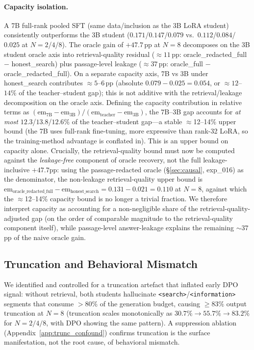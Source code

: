 \paragraph{Capacity isolation.}
\label{sec:capacity}
A 7B full-rank pooled SFT (same data/inclusion as the 3B LoRA student) consistently outperforms the 3B student ($0.171$/$0.147$/$0.079$ vs.\ $0.112$/$0.084$/$0.025$ at $N\!=\!2$/$4$/$8$). The oracle gain of $+47.7$\,pp at $N{=}8$ decomposes on the 3B student oracle axis into retrieval-quality residual ($\approx 11$\,pp: oracle\_redacted\_full $-$ honest\_search) plus passage-level leakage ($\approx 37$\,pp: oracle\_full $-$ oracle\_redacted\_full). On a separate capacity axis, 7B vs 3B under honest\_search contributes $\approx 5$--$6$\,pp (absolute $0.079 - 0.025 = 0.054$, or $\approx 12$--$14\%$ of the teacher--student gap); this is not additive with the retrieval/leakage decomposition on the oracle axis. Defining the capacity contribution in relative terms as $({\text{em}_{7\text{B}} - \text{em}_{3\text{B}}}) / ({\text{em}_{\text{teacher}} - \text{em}_{3\text{B}}})$, the 7B--3B gap accounts for \emph{at most} $12.3$/$13.8$/$12.6\%$ of the teacher--student gap---a stable $\approx$12--14\% upper bound (the 7B uses full-rank fine-tuning, more expressive than rank-32 LoRA, so the training-method advantage is conflated in). This is an upper bound on capacity alone. Crucially, the retrieval-quality bound must now be computed against the \emph{leakage-free} component of oracle recovery, not the full leakage-inclusive $+47.7$pp: using the passage-redacted oracle (\S\ref{sec:causal}, exp\_016) as the denominator, the non-leakage retrieval-quality upper bound is $\text{em}_{\text{oracle\_redacted\_full}} - \text{em}_{\text{honest\_search}} = 0.131 - 0.021 = 0.110$ at $N\!=\!8$, against which the $\approx$12--14\% capacity bound is no longer a trivial fraction. We therefore interpret capacity as accounting for a non-negligible share of the retrieval-quality-adjusted gap (on the order of comparable magnitude to the retrieval-quality component itself), while passage-level answer-leakage explains the remaining ${\sim}37$pp of the naive oracle gain.

\subsection{Truncation and Behavioral Mismatch}
\label{sec:suppression}

We identified and controlled for a truncation artefact that inflated early DPO signal: without retrieval, both students hallucinate \texttt{<search>}/\texttt{<information>} segments that consume $>80\%$ of the generation budget, causing $\geq 83\%$ output truncation at $N\!=\!8$ (truncation scales monotonically as $30.7\%\!\to\!55.7\%\!\to\!83.2\%$ for $N\!=\!2/4/8$, with DPO showing the same pattern). A suppression ablation (Appendix~\ref{app:trunc_confound}) confirms truncation is the surface manifestation, not the root cause, of behavioral mismatch.


